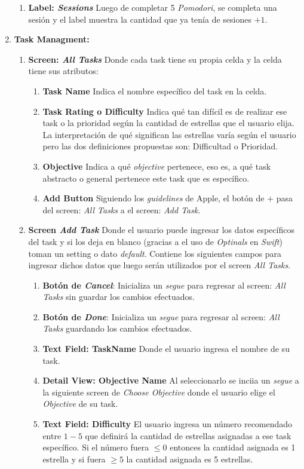 \documentclass[]{article}
\begin{document}
\begin{enumerate}
\begin{enumerate}
		\item \textbf{Label: \textit{Sessions}} Luego de completar 5 \textit{Pomodori}, se completa una sesión y el label muestra la cantidad que ya tenía de sesiones $+1$.
	\end{enumerate}
	\item \textbf{Task Managment:}
	\begin{enumerate}
		\item \textbf{Screen: \textit{All Tasks}} Donde cada task tiene su propia celda y la celda tiene sus atributos:
		\begin{enumerate}
			\item \textbf{Task Name} Indica el nombre específico del task en la celda.
			\item \textbf{Task Rating o Difficulty} Indica qué tan difícil es de realizar ese task o la prioridad según la cantidad de estrellas que el usuario elija. La interpretación de qué significan las estrellas varía según el usuario pero las dos definiciones propuestas son: Difficultad o Prioridad. 
			\item \textbf{Objective} Indica a qué \textit{objective} pertenece, eso es, a qué task abstracto o general pertenece este task que es específico.
			\item \textbf{Add Button} Siguiendo los \textit{guidelines} de Apple, el botón de $+$ pasa del screen: \textit{All Tasks} a el screen: \textit{Add Task}.
		\end{enumerate}
		\item \textbf{Screen \textit{Add Task}} Donde el usuario puede ingresar los datos específicos del task y si los deja en blanco (gracias a el uso de \textit{Optinals} en \textit{Swift}) toman un setting o dato \textit{default}. Contiene los siguientes campos para ingresar dichos datos que luego serán utilizados por el screen \textit{All Tasks}.
		\begin{enumerate}
			\item \textbf{Botón de \textit{Cancel}}: Inicializa un \textit{segue} para regresar al screen: \textit{All Tasks} sin guardar los cambios efectuados.
			\item \textbf{Botón de \textit{Done}}: Inicializa un \textit{segue} para regresar al screen: \textit{All Tasks} guardando los cambios efectuados.
			\item \textbf{Text Field: TaskName} Donde el usuario ingresa el nombre de su task.
			\item \textbf{Detail View: Objective Name} Al seleccionarlo se inciia un \textit{segue} a la siguiente screen de \textit{Choose Objective} donde el usuario elige el \textit{Objective} de su task.
			\item \textbf{Text Field: Difficulty} El usuario ingresa un número recomendado entre $1 - 5$ que definirá la cantidad de estrellas asignadas a ese task específico. Si el número fuera $\leq 0$ entonces la cantidad asignada es 1 estrella y si fuera $\geq 5$ la cantidad asignada es 5 estrellas. 
		\end{enumerate}
	\end{enumerate}
\end{enumerate}
\end{document}
